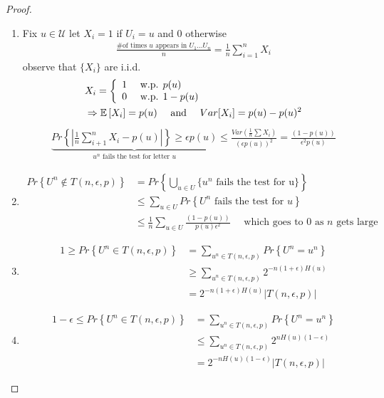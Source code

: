 \documentclass[twoside]{article}
\theoremstyle{definition} %
\renewcommand{\Pr}[1]{Pr\left\{#1\right\}}
\newcommand{\Ex}[1]{\mathbb{E}\left[#1\right]}
\def\U{\mathcal{U}}
\begin{document}
\begin{proof}
  \begin{enumerate}
    \item
    Fix $u \in \U$ let $X_i = 1$ if $ U_i = u$ and $0$ otherwise
    \begin{align*}
      \frac{\text{\# of times } u \text{ appears in } U_1 ... U_n}{n} = \frac{1}{n} \sum_{i = 1}^n X_i
    \end{align*}
    observe that $\{ X_i \}$ are i.i.d.
    \begin{align*}
      &X_i =
      \left\{
        \begin{array}{l l}
          1 & \text{ w.p. } p(u) \\
          0 & \text{ w.p. } 1 - p(u)
        \end{array}
      \right. \\
      &\Rightarrow \Ex{X_i} = p(u) \quad \text{ and } \quad Var[X_i] = p(u) - p(u)^2 \\
    \end{align*}
    \begin{align*}
      \underbrace{
        \Pr{|\frac{1}{n} \sum_{i+1}^n X_i - p(u)|}\geq \epsilon p(u)
      }_{u^n \text{ fails the test for letter } u}
      \leq
      \frac{Var(\frac{1}{n} \sum X_i)}{(\epsilon p(u))^2}
      = \frac{(1 - p(u))}{\epsilon^2 p(u)}
    \end{align*}

    \item
    \begin{align*}
      \Pr{U^n \not \in T(n, \epsilon, p)} &= \Pr{\bigcup_{u \in U} \{u^n \text{ fails the test for u} \}} \\
      &\leq \sum_{u \in U} \Pr{U^n \text{ fails the test for } u} \\
      &\leq \frac{1}{n} \sum_{u \in U} \frac{(1 - p(u))}{p(u) \epsilon^2} \quad \text{ which goes to 0 as } n \text{ gets large}
    \end{align*}

    \item
    \begin{align*}
      1 \geq \Pr{U^n \in T(n, \epsilon, p)} &= \sum_{u^n \in T(n, \epsilon, p)} \Pr{U^n = u^n} \\
      &\geq \sum_{u^n \in T(n, \epsilon, p)} 2^{-n(1 + \epsilon) H(u)} \\
      &= 2^{-n (1 + \epsilon) H(u)} |T(n, \epsilon, p)|
    \end{align*}

    \item
    \begin{align*}
      1 - \epsilon \leq \Pr{U^n \in T(n, \epsilon, p)} &= \sum_{u^n \in T(n, \epsilon, p)} \Pr{U^n = u^n} \\
       &\leq \sum_{u^n \in T(n, \epsilon, p)} 2^{n H(u)(1-\epsilon)} \\
       &= 2^{-n H(u)(1 - \epsilon)} |T(n, \epsilon, p)|
    \end{align*}

  \end{enumerate}
\end{proof}
\end{document}
